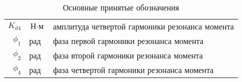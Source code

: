 \begin{table}[ht!]
\begin{tabular}{rll}
    $K_{d4}$ & $\text{Н} \cdot \text{м}$ & амплитуда четвертой гармоники резонанса момента \\

    $\phi_{1}$ & рад & фаза первой гармоники резонанса момента \\

    $\phi_{2}$ & рад & фаза второй гармоники резонанса момента \\

    $\phi_{4}$ & рад & фаза четвертой гармоники резонанса момента \\
    
    \end{tabular}
    \caption{ Основные принятые обозначения }
\end{table}

